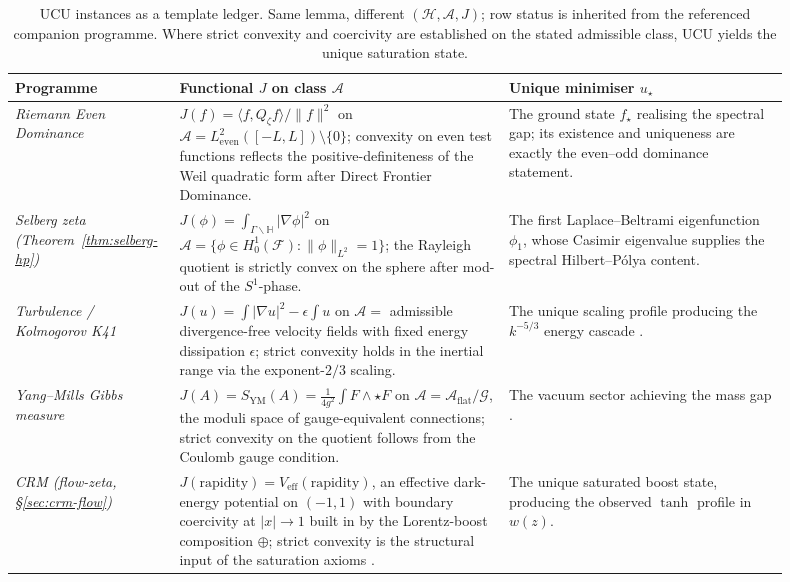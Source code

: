 \documentclass[11pt]{article}
\theoremstyle{definition}
\theoremstyle{remark}
\begin{document}
\renewcommand{\arraystretch}{1.25}
\begin{table}[htbp]
\centering
\scriptsize
\setlength{\tabcolsep}{3pt}
\begin{tabular}{|p{0.16\linewidth}|p{0.40\linewidth}|p{0.34\linewidth}|}
\hline
\textbf{Programme} & \textbf{Functional $J$ on class $\mathcal{A}$} &
\textbf{Unique minimiser $u_\star$} \\ \hline

\emph{Riemann Even Dominance} \cite{Geiger2026RHII}
& $J(f) = \langle f, Q_\zeta f \rangle / \|f\|^2$ on
$\mathcal{A} = L^2_\mathrm{even}([-L,L]) \setminus \{0\}$;
convexity on even test functions reflects the positive-definiteness
of the Weil quadratic form after Direct Frontier Dominance.
& The ground state $f_\star$ realising the spectral gap;
its existence and uniqueness are exactly the
even--odd dominance statement. \\ \hline

\emph{Selberg zeta (Theorem~\ref{thm:selberg-hp})}
& $J(\phi) = \int_{\Gamma\backslash\mathbb{H}} |\nabla \phi|^2$
on $\mathcal{A} = \{\phi \in H^1_0(\mathcal{F}) : \|\phi\|_{L^2}=1\}$;
the Rayleigh quotient is strictly convex on the sphere after
mod-out of the $S^1$-phase.
& The first Laplace--Beltrami eigenfunction $\phi_1$, whose
Casimir eigenvalue supplies the spectral Hilbert--P\'olya content. \\ \hline

\emph{Turbulence / Kolmogorov K41}
& $J(u) = \int |\nabla u|^2 - \epsilon \int u$ on
$\mathcal{A} = $ admissible divergence-free velocity fields with
fixed energy dissipation $\epsilon$; strict convexity holds in the
inertial range via the exponent-$2/3$ scaling.
& The unique scaling profile producing the $k^{-5/3}$ energy
cascade \cite{FSTTurbulence}. \\ \hline

\emph{Yang--Mills Gibbs measure}
& $J(A) = S_{\mathrm{YM}}(A) = \tfrac{1}{4g^2}\int F \wedge {\star F}$
on $\mathcal{A} = \mathcal{A}_{\mathrm{flat}} / \mathcal{G}$, the
moduli space of gauge-equivalent connections; strict convexity on
the quotient follows from the Coulomb gauge condition.
& The vacuum sector achieving the mass gap
\cite{FSTYangMills}. \\ \hline

\emph{CRM (flow-zeta, \S\ref{sec:crm-flow})}
& $J(\mathrm{rapidity}) = V_{\mathrm{eff}}(\mathrm{rapidity})$, an
effective dark-energy potential on $(-1,1)$ with boundary
coercivity at $|x| \to 1$ built in by the Lorentz-boost composition
$\oplus$; strict convexity is the structural input of the
saturation axioms \cite{CRMV}.
& The unique saturated boost state, producing the observed $\tanh$
profile in $w(z)$. \\ \hline

\end{tabular}
\caption{UCU instances as a template ledger. Same lemma, different
$(\mathcal{H},\mathcal{A},J)$; row status is inherited from the
referenced companion programme. Where strict convexity and coercivity
are established on the stated admissible class, UCU yields the unique
saturation state.}
\label{tab:ucu-instances}
\end{table}
\renewcommand{\arraystretch}{1.0}
\end{document}
